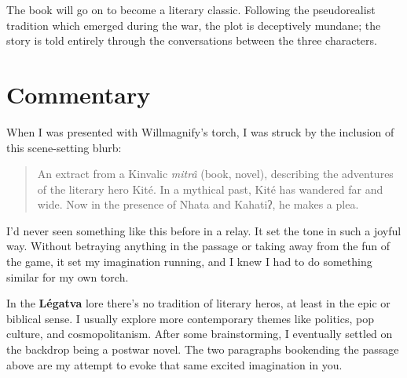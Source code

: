 \documentclass[fontsize=12pt,twoside=false,numbers=noenddot]{class/kaobook}
\newcommand{\rzc}{\color[HTML]{5B2D90}}
\newcommand{\rz}[1]{\textit{\rzc #1}}
\newcommand{\tit}[1]{\textit{#1}}
\newcommand{\tbf}[1]{\textbf{#1}}
\begin{document}
The book will go on to become a literary classic. Following the pseudorealist tradition which emerged during the war, the plot is deceptively mundane; the story is told entirely through the conversations between the three characters. 

\chapter{Commentary}

When I was presented with Willmagnify's torch, I was struck by the inclusion of this scene-setting blurb: 

\begin{quote}
An extract from a Kinvalic \tit{mitrâ} (book, novel), describing the adventures of the literary hero Kité. In a mythical past, Kité has wandered far and wide. Now in the presence of Nhata and Kahatiʔ, he makes a plea.
\end{quote}

I'd never seen something like this before in a relay. It set the tone in such a joyful way. Without betraying anything in the passage or taking away from the fun of the game, it set my imagination running, and I knew I had to do something similar for my own torch.

In the \tbf{Légatva} lore there's no tradition of literary heros, at least in the epic or biblical sense. I usually explore more contemporary themes like politics, pop culture, and cosmopolitanism. After some brainstorming, I eventually settled on the backdrop being a postwar novel. %
The two paragraphs bookending the passage above are my attempt to evoke that same excited imagination in you. 


\end{document}
